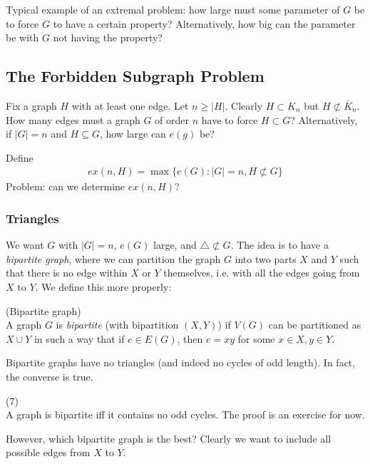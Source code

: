 \documentclass[a4paper]{article}
\begin{document}
Typical example of an extremal problem: how large must some parameter of $G$ be to force $G$ to have a certain property? Alternatively, how big can the parameter be with $G$ not having the property?

\subsection{The Forbidden Subgraph Problem}
Fix a graph $H$ with at least one edge. Let $n \geq |H|$. Clearly $H \subset K_n$ but $H \not\subset \bar{K}_n$. How many edges must a graph $G$ of order $n$ have to force $H \subset G$? Alternatively, if $|G| = n$ and $H \subseteq G$, how large can $e(g)$ be?

\begin{defi}
Define
\begin{equation*}
\begin{aligned}
ex(n,H) = \max\{e(G):|G|=n,H \not\subset G\}
\end{aligned}
\end{equation*}
Problem: can we determine $ex(n,H)$?
\end{defi}

\subsubsection{Triangles}
We want $G$ with $|G|=n$, $e(G)$ large, and $\triangle \not\subset G$. The idea is to have a \emph{bipartite graph}, where we can partition the graph $G$ into two parts $X$ and $Y$ such that there is no edge within $X$ or $Y$ themselves, i.e. with all the edges going from $X$ to $Y$. We define this more properly:

\begin{defi} (Bipartite graph)\\
A graph $G$ is \emph{bipartite} (with bipartition $(X,Y)$) if $V(G)$ can be partitioned as $X \cup Y$ in such a way that if $e \in E(G)$, then $e = xy$ for some $x \in X, y \in Y$.
\end{defi}

Bipartite graphs have no triangles (and indeed no cycles of odd length). In fact, the converse is true.

\begin{thm} (7)\\
A graph is bipartite iff it contains no odd cycles. The proof is an exercise for now.
\end{thm}

However, which bipartite graph is the best? Clearly we want to include all possible edges from $X$ to $Y$.
\end{document}
